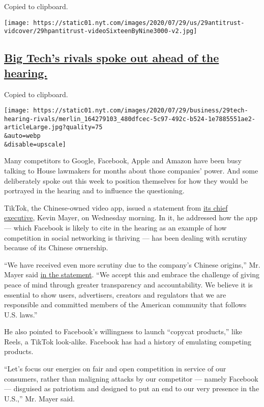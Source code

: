 Copied to clipboard.

\texttt{[image: https://static01.nyt.com/images/2020/07/29/us/29antitrust-vidcover/29hpantitrust-videoSixteenByNine3000-v2.jpg]}

\hypertarget{big-techs-rivals-spoke-out-ahead-of-the-hearing}{%
\subsection{\texorpdfstring{\protect\hyperlink{big-techs-rivals-spoke-out-ahead-of-the-hearing}{Big
Tech's rivals spoke out ahead of the
hearing.}}{Big Tech's rivals spoke out ahead of the hearing.}}\label{big-techs-rivals-spoke-out-ahead-of-the-hearing}}

Copied to clipboard.

\texttt{[image: https://static01.nyt.com/images/2020/07/29/business/29tech-hearing-rivals/merlin\_164279103\_480dfcec-5c97-492c-b524-1e7885551ae2-articleLarge.jpg?quality=75\\\&auto=webp\\\&disable=upscale]}

Many competitors to Google, Facebook, Apple and Amazon have been busy
talking to House lawmakers for months about those companies' power. And
some deliberately spoke out this week to position themselves for how
they would be portrayed in the hearing and to influence the questioning.

TikTok, the Chinese-owned video app, issued a statement from
\href{https://www.nytimes.com/2020/05/18/business/media/tiktok-ceo-kevin-mayer.html}{its
chief executive}, Kevin Mayer, on Wednesday morning. In it, he addressed
how the app --- which Facebook is likely to cite in the hearing as an
example of how competition in social networking is thriving --- has been
dealing with scrutiny because of its Chinese ownership.

``We have received even more scrutiny due to the company's Chinese
origins,'' Mr. Mayer said
\href{https://newsroom.tiktok.com/en-us/fair-competition-and-transparency-benefits-us-all}{in
the statement}. ``We accept this and embrace the challenge of giving
peace of mind through greater transparency and accountability. We
believe it is essential to show users, advertisers, creators and
regulators that we are responsible and committed members of the American
community that follows U.S. laws.''

He also pointed to Facebook's willingness to launch ``copycat
products,'' like Reels, a TikTok look-alike. Facebook has had a history
of emulating competing products.

``Let's focus our energies on fair and open competition in service of
our consumers, rather than maligning attacks by our competitor ---
namely Facebook --- disguised as patriotism and designed to put an end
to our very presence in the U.S.,'' Mr. Mayer said.

